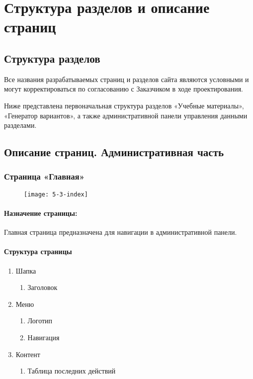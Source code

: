 \section{Структура разделов и описание страниц}
\subsection{Структура разделов}
Все названия разрабатываемых страниц и разделов сайта являются условными и могут корректироваться по согласованию с Заказчиком в ходе проектирования.

Ниже представлена первоначальная структура разделов «Учебные материалы», «Генератор вариантов», а также административной панели управления данными разделами.

\subsection{Описание страниц. Административная часть}
\subsubsection{Страница «Главная»}
\begin{figure}[H]
	\texttt{[image: 5-3-index]}
\end{figure}
\paragraph{Назначение страницы:}
Главная страница предназначена для навигации в административной панели.

\paragraph{Структура страницы}
\begin{enumerate}
	\item Шапка
	\begin{enumerate}
		\item Заголовок
	\end{enumerate}

	\item Меню
	\begin{enumerate}
		\item  Логотип
		\item  Навигация
	\end{enumerate}

	\item  Контент
	\begin{enumerate}
		\item  Таблица последних действий
	\end{enumerate}
\end{enumerate}

